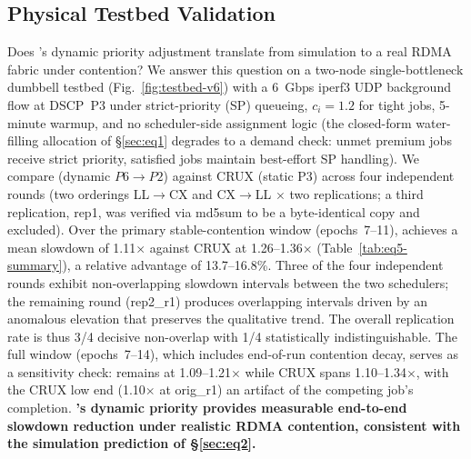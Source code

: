 \subsection{Physical Testbed Validation}
\label{sec:eq5}

Does \Name's dynamic priority adjustment translate from simulation to a
real RDMA fabric under contention?
We answer this question on a two-node single-bottleneck dumbbell testbed
(Fig.~\ref{fig:testbed-v6}) with a 6~Gbps iperf3 UDP background flow at
DSCP~P3 under strict-priority (SP) queueing, $c_i=1.2$ for tight jobs,
5-minute warmup, and no scheduler-side assignment logic (the closed-form
water-filling allocation of \S\ref{sec:eq1} degrades to a demand check:
unmet premium jobs receive strict priority, satisfied jobs maintain
best-effort SP handling).
We compare \Name (dynamic $P6{\rightarrow}P2$) against CRUX (static
P3) across four independent rounds (two orderings LL$\rightarrow$CX and
CX$\rightarrow$LL $\times$ two replications; a third replication, rep1,
was verified via md5sum to be a byte-identical copy and excluded).
Over the primary stable-contention window (epochs~7--11), \Name achieves
a mean slowdown of 1.11$\times$ against CRUX at 1.26--1.36$\times$
(Table~\ref{tab:eq5-summary}), a relative advantage of 13.7--16.8\%.
Three of the four independent rounds exhibit non-overlapping slowdown
intervals between the two schedulers; the remaining round (rep2\_r1)
produces overlapping intervals driven by an anomalous \Name elevation
that preserves the qualitative trend.  The overall replication rate is
thus 3/4 decisive non-overlap with 1/4 statistically indistinguishable.
The full window (epochs~7--14), which includes end-of-run contention
decay, serves as a sensitivity check: \Name remains at 1.09--1.21$\times$
while CRUX spans 1.10--1.34$\times$, with the CRUX low end
(1.10$\times$ at orig\_r1) an artifact of the competing job's completion.
\textbf{\Name's dynamic priority provides measurable end-to-end slowdown
reduction under realistic RDMA contention, consistent with the simulation
prediction of \S\ref{sec:eq2}.}

